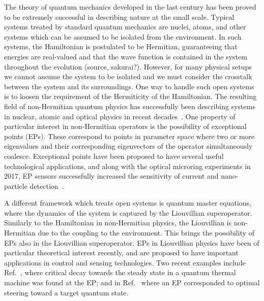 \documentclass[../main.tex]{subfiles}
\begin{document}
The theory of quantum mechanics developed in the last century has been proved to be extremely successful in describing nature at the small scale. Typical systems treated by standard quantum mechanics are nuclei, atoms, and other systems which can be assumed to be isolated from the environment. In such systems, the Hamiltonian is postulated to be Hermitian, guaranteeing that energies are real-valued and that the wave function is contained in the system throughout the evolution (source, sakurai?). However, for many physical setups we cannot assume the system to be isolated and we must consider the crosstalk between the system and its surroundings. One way to handle such open systems is to loosen the requirement of the Hermiticity of the Hamiltonian. The resulting field of non-Hermitian quantum physics has successfully been describing systems in nuclear, atomic and optical physics in recent decades~\cite{nonHermrev}. One property of particular interest in non-Hermitian operators is the possibility of exceptional points (EPs). These correspond to points in parameter space where two or more eigenvalues and their corresponding eigenvectors of the operator simultaneously coalesce. Exceptional points have been proposed to have several useful technological applications, and along with the optical microring experiments in 2017, EP sensors successfully increased the sensitivity of current and nano-particle detection~\cite{microring1, microring2}.

A different framework which treats open systems is quantum master equations, where the dynamics of the system is captured by the Liouvillian superoperator. Similarly to the Hamiltonian in non-Hermitian physics, the Liouvillian is non-Hermitian due to the coupling to the environment. This brings the possibility of EPs also in the Liouvillian superoperator. EPs in Liouvillian physics have been of particular theoretical interest recently, and are proposed to have important applications in control and sensing technologies. Two recent examples include Ref.~\cite{thermal}, where critical decay towards the steady state in a quantum thermal machine was found at the EP; and in Ref.~\cite{steering} where an EP corresponded to optimal steering toward a target quantum state. 
\end{document}
